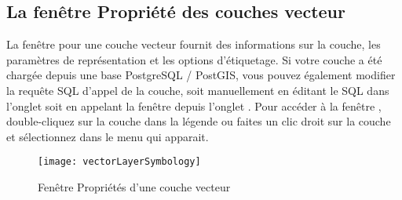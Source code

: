 \subsection{La fen\^etre Propri\'et\'e des couches vecteur}\label{sec:vectorprops}

La fen\^etre  pour une couche vecteur fournit des informations sur la couche, les param\`etres de repr\'esentation et les options d'\'etiquetage. Si votre couche a \'et\'e charg\'ee depuis une base PostgreSQL / PostGIS, vous pouvez \'egalement modifier la requ\^ete SQL d'appel de la couche, soit manuellement en \'editant le SQL dans l'onglet  soit en appelant la fen\^etre  depuis l'onglet . Pour acc\'eder \`a la fen\^etre , double-cliquez sur la couche dans la l\'egende ou faites un clic droit sur la couche et s\'electionnez  dans le menu qui apparait.

\begin{figure}[H]
  \begin{center}
  \caption{Fen\^etre Propri\'et\'es d'une couche vecteur \nixcaption}\label{fig:vector_symbology}\smallskip
  \texttt{[image: vectorLayerSymbology]}
\end{center}
\end{figure}

